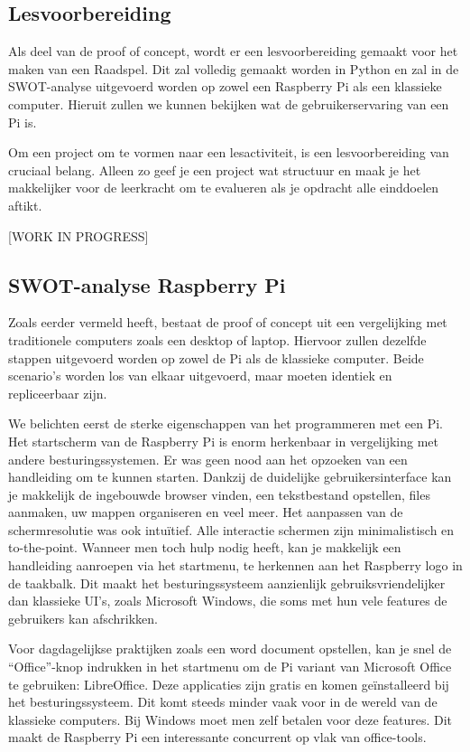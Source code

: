 \subsection{Lesvoorbereiding}
Als deel van de proof of concept, wordt er een lesvoorbereiding gemaakt voor het maken van een Raadspel. Dit zal volledig gemaakt worden in Python en zal in de SWOT-analyse uitgevoerd worden op zowel een Raspberry Pi als een klassieke computer. Hieruit zullen we kunnen bekijken wat de gebruikerservaring van een Pi is.

Om een project om te vormen naar een lesactiviteit, is een lesvoorbereiding van cruciaal belang. Alleen zo geef je een project wat structuur en maak je het makkelijker voor de leerkracht om te evalueren als je opdracht alle einddoelen aftikt.

[WORK IN PROGRESS]

\subsection{SWOT-analyse Raspberry Pi}

Zoals eerder vermeld heeft, bestaat de proof of concept uit een vergelijking met traditionele computers zoals een desktop of laptop. Hiervoor zullen dezelfde stappen uitgevoerd worden op zowel de Pi als de klassieke computer. Beide scenario’s worden los van elkaar uitgevoerd, maar moeten identiek en repliceerbaar zijn.


We belichten eerst de sterke eigenschappen van het programmeren met een Pi. 
Het startscherm van de Raspberry Pi is enorm herkenbaar in vergelijking met andere besturingssystemen. Er was geen nood aan het opzoeken van een handleiding om te kunnen starten. Dankzij de duidelijke gebruikersinterface kan je makkelijk de ingebouwde browser vinden, een tekstbestand opstellen, files aanmaken, uw mappen organiseren en veel meer. Het aanpassen van de schermresolutie was ook intuïtief. Alle interactie schermen zijn minimalistisch en to-the-point. Wanneer men toch hulp nodig heeft, kan je makkelijk een handleiding aanroepen via het startmenu, te herkennen aan het Raspberry logo in de taakbalk. Dit maakt het besturingssysteem aanzienlijk gebruiksvriendelijker dan klassieke UI’s, zoals Microsoft Windows, die soms met hun vele features de gebruikers kan afschrikken.

Voor dagdagelijkse praktijken zoals een word document opstellen, kan je snel de “Office”-knop indrukken in het startmenu om de Pi variant van Microsoft Office te gebruiken: LibreOffice. Deze applicaties zijn gratis en komen geïnstalleerd bij het besturingssysteem. Dit komt steeds minder vaak voor in de wereld van de klassieke computers. Bij Windows moet men zelf betalen voor deze features. Dit maakt de Raspberry Pi een interessante concurrent op vlak van office-tools.

